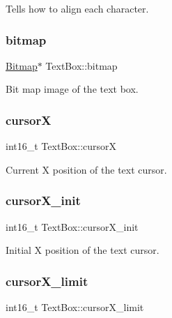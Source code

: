 Tells how to align each character. 

\mbox{\label{group__textbox_gadde5ca94c24a93bc01b4307b51cb9e3f}} 
\subsubsection{\texorpdfstring{bitmap}{bitmap}}
{\footnotesize\ttfamily \mbox{\hyperlink{struct_bitmap}{Bitmap}}$\ast$ Text\+Box\+::bitmap}



Bit map image of the text box. 

\mbox{\label{group__textbox_gab8a4ab22fd92b094d7e20da5dd4c6ecb}} 
\subsubsection{\texorpdfstring{cursorX}{cursorX}}
{\footnotesize\ttfamily int16\+\_\+t Text\+Box\+::cursorX}



Current X position of the text cursor. 

\mbox{\label{group__textbox_gaa505c0e1aa35305c1af3b71a5b761393}} 
\subsubsection{\texorpdfstring{cursor\+X\+\_\+init}{cursorX\_init}}
{\footnotesize\ttfamily int16\+\_\+t Text\+Box\+::cursor\+X\+\_\+init}



Initial X position of the text cursor. 

\mbox{\label{group__textbox_gaab8db5873b8af1889aaef0a088383d07}} 
\subsubsection{\texorpdfstring{cursor\+X\+\_\+limit}{cursorX\_limit}}
{\footnotesize\ttfamily int16\+\_\+t Text\+Box\+::cursor\+X\+\_\+limit}



